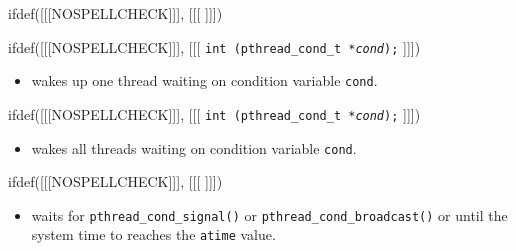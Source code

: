 
ifdef([[[NOSPELLCHECK]]], [[[
]]])

\begin{slide}
\prgchars
ifdef([[[NOSPELLCHECK]]], [[[
\texttt{int (pthread\_cond\_t *\emph{cond});}
]]])
\begin{itemize}
\item wakes up one thread waiting on condition variable
\texttt{cond}.
\end{itemize}
ifdef([[[NOSPELLCHECK]]], [[[
\texttt{int (pthread\_cond\_t *\emph{cond});}
]]])
\begin{itemize}
\item wakes all threads waiting on condition variable
\texttt{cond}.
\end{itemize}
ifdef([[[NOSPELLCHECK]]], [[[
]]])
\begin{itemize}
\item waits for \texttt{pthread\_cond\_signal()} or
\texttt{pthread\_cond\_broadcast()} or until the system time to reaches the
\texttt{atime} value.
\end{itemize}
\end{slide}

